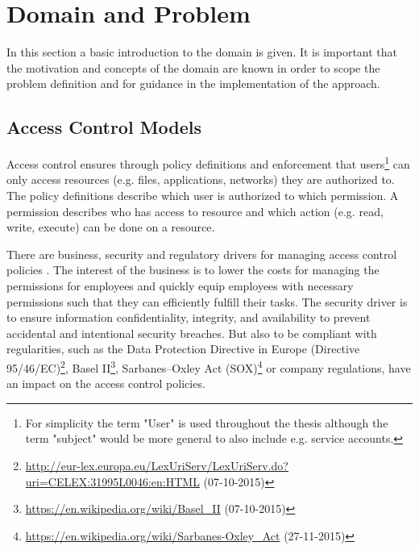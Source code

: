\newpage
\chapter{Domain and Problem}
\label{sec:domain}
In this section a basic introduction to the domain is given. It is important that the motivation and concepts of the domain are known in order to scope the problem definition and for guidance in the implementation of the approach.

    \section{Access Control Models}
    Access control ensures through policy definitions and enforcement that users\footnote{For simplicity the term "User" is used throughout the thesis although the term "subject" would be more general to also include e.g. service accounts.} can only access resources (e.g. files, applications, networks) they are authorized to. The policy definitions describe which user is authorized to which permission. A permission describes who has access to resource and which action (e.g. read, write, execute) can be done on a resource.
    
    There are business, security and regulatory drivers for managing access control policies \cite{o20102010}. The interest of the business is to lower the costs for managing the permissions for employees and quickly equip employees with necessary permissions such that they can efficiently fulfill their tasks. The security driver is to ensure information confidentiality, integrity, and availability to prevent accidental and intentional security breaches. But also to be compliant with regularities, such as the Data Protection Directive in Europe (Directive 95/46/EC)\footnote{\url{http://eur-lex.europa.eu/LexUriServ/LexUriServ.do?uri=CELEX:31995L0046:en:HTML} (07-10-2015)}, Basel II\footnote{\url{https://en.wikipedia.org/wiki/Basel_II} (07-10-2015)}, Sarbanes–Oxley Act (SOX)\footnote{\url{https://en.wikipedia.org/wiki/Sarbanes-Oxley_Act} (27-11-2015)} or company regulations, have an impact on the access control policies.
    
